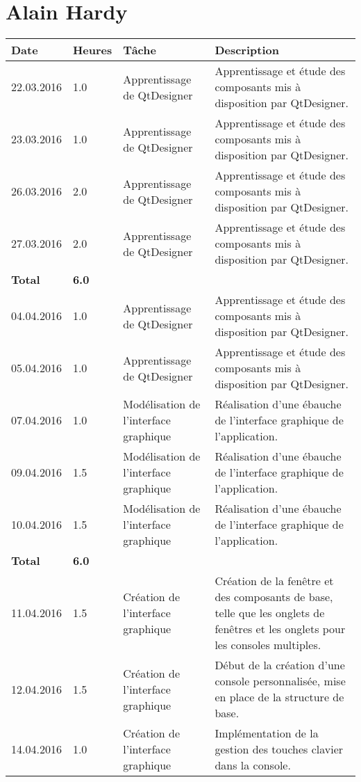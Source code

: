 \documentclass[french]{article}
\begin{document}
	\section*{Alain Hardy}
	\begin{longtable}{p{}|p{}|p{}|p{}}
		Date&Heures&Tâche&Description\\
		\hline\hline
		22.03.2016 & 1.0 & Apprentissage de QtDesigner & Apprentissage et étude des composants mis à disposition par QtDesigner.\\
		23.03.2016 & 1.0 & Apprentissage de QtDesigner & Apprentissage et étude des composants mis à disposition par QtDesigner.\\
		26.03.2016 & 2.0 & Apprentissage de QtDesigner & Apprentissage et étude des composants mis à disposition par QtDesigner.\\
		27.03.2016 & 2.0 & Apprentissage de QtDesigner & Apprentissage et étude des composants mis à disposition par QtDesigner.\\
		\textbf{Total} & \textbf{6.0} &&\\
		\hline
		04.04.2016 & 1.0 & Apprentissage de QtDesigner & Apprentissage et étude des composants mis à disposition par QtDesigner.\\
		05.04.2016 & 1.0 & Apprentissage de QtDesigner & Apprentissage et étude des composants mis à disposition par QtDesigner.\\
		07.04.2016 & 1.0 & Modélisation de l'interface graphique & Réalisation d'une ébauche de l'interface graphique de l'application.\\
		09.04.2016 & 1.5 & Modélisation de l'interface graphique & Réalisation d'une ébauche de l'interface graphique de l'application.\\
		10.04.2016 & 1.5 & Modélisation de l'interface graphique & Réalisation d'une ébauche de l'interface graphique de l'application.\\
		\textbf{Total} & \textbf{6.0} &&\\
		\hline
		11.04.2016 & 1.5 & Création de l'interface graphique & Création de la fenêtre et des composants de base, telle que les onglets de fenêtres et les onglets pour les consoles multiples.\\
		12.04.2016 & 1.5 & Création de l'interface graphique & Début de la création d'une console personnalisée, mise en place de la structure de base.\\
		14.04.2016 & 1.0 & Création de l'interface graphique & Implémentation de la gestion des touches clavier dans la console.\\

\end{longtable}
\end{document}
